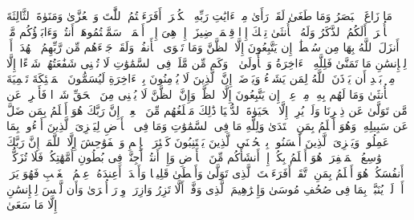 \startbuffer[\q:53:17]
مَا زَاغَ ٱلۡبَصَرُ وَمَا طَغَىٰ%
\stopbuffer
\startbuffer[\q:53:18]
لَقَدۡ رَأَىٰ مِنۡ ءَایَٰتِ رَبِّهِ ٱلۡكُبۡرَىٰۤ%
\stopbuffer
\startbuffer[\q:53:19]
أَفَرَءَیۡتُمُ ٱللَّٰتَ وَٱلۡعُزَّىٰ%
\stopbuffer
\startbuffer[\q:53:20]
وَمَنَوٰةَ ٱلثَّالِثَةَ ٱلۡأُخۡرَىٰۤ%
\stopbuffer
\startbuffer[\q:53:21]
أَلَكُمُ ٱلذَّكَرُ وَلَهُ ٱلۡأُنثَىٰ%
\stopbuffer
\startbuffer[\q:53:22]
تِلۡكَ إِذࣰا قِسۡمَةࣱ ضِیزَىٰۤ%
\stopbuffer
\startbuffer[\q:53:23]
إِنۡ هِیَ إِلَّاۤ أَسۡمَاۤءࣱ سَمَّیۡتُمُوهَاۤ أَنتُمۡ وَءَابَاۤؤُكُم مَّاۤ أَنزَلَ ٱللَّهُ بِهَا مِن سُلۡطَٰنٍۚ إِن یَتَّبِعُونَ إِلَّا ٱلظَّنَّ وَمَا تَهۡوَى ٱلۡأَنفُسُۖ وَلَقَدۡ جَاۤءَهُم مِّن رَّبِّهِمُ ٱلۡهُدَىٰۤ%
\stopbuffer
\startbuffer[\q:53:24]
أَمۡ لِلۡإِنسَٰنِ مَا تَمَنَّىٰ%
\stopbuffer
\startbuffer[\q:53:25]
فَلِلَّهِ ٱلۡءَاخِرَةُ وَٱلۡأُولَىٰ%
\stopbuffer
\startbuffer[\q:53:26]
۞ وَكَم مِّن مَّلَكࣲ فِی ٱلسَّمَٰوَٰتِ لَا تُغۡنِی شَفَٰعَتُهُمۡ شَیۡءًا إِلَّا مِنۢ بَعۡدِ أَن یَأۡذَنَ ٱللَّهُ لِمَن یَشَاۤءُ وَیَرۡضَىٰۤ%
\stopbuffer
\startbuffer[\q:53:27]
إِنَّ ٱلَّذِینَ لَا یُؤۡمِنُونَ بِٱلۡءَاخِرَةِ لَیُسَمُّونَ ٱلۡمَلَٰۤئِكَةَ تَسۡمِیَةَ ٱلۡأُنثَىٰ%
\stopbuffer
\startbuffer[\q:53:28]
وَمَا لَهُم بِهِۦ مِنۡ عِلۡمٍۖ إِن یَتَّبِعُونَ إِلَّا ٱلظَّنَّۖ وَإِنَّ ٱلظَّنَّ لَا یُغۡنِی مِنَ ٱلۡحَقِّ شَیۡءࣰا%
\stopbuffer
\startbuffer[\q:53:29]
فَأَعۡرِضۡ عَن مَّن تَوَلَّىٰ عَن ذِكۡرِنَا وَلَمۡ یُرِدۡ إِلَّا ٱلۡحَیَوٰةَ ٱلدُّنۡیَا%
\stopbuffer
\startbuffer[\q:53:30]
ذَٰلِكَ مَبۡلَغُهُم مِّنَ ٱلۡعِلۡمِۚ إِنَّ رَبَّكَ هُوَ أَعۡلَمُ بِمَن ضَلَّ عَن سَبِیلِهِۦ وَهُوَ أَعۡلَمُ بِمَنِ ٱهۡتَدَىٰ%
\stopbuffer
\startbuffer[\q:53:31]
وَلِلَّهِ مَا فِی ٱلسَّمَٰوَٰتِ وَمَا فِی ٱلۡأَرۡضِ لِیَجۡزِیَ ٱلَّذِینَ أَسَٰۤءُوا۟ بِمَا عَمِلُوا۟ وَیَجۡزِیَ ٱلَّذِینَ أَحۡسَنُوا۟ بِٱلۡحُسۡنَى%
\stopbuffer
\startbuffer[\q:53:32]
ٱلَّذِینَ یَجۡتَنِبُونَ كَبَٰۤئِرَ ٱلۡإِثۡمِ وَٱلۡفَوَٰحِشَ إِلَّا ٱللَّمَمَۚ إِنَّ رَبَّكَ وَٰسِعُ ٱلۡمَغۡفِرَةِۚ هُوَ أَعۡلَمُ بِكُمۡ إِذۡ أَنشَأَكُم مِّنَ ٱلۡأَرۡضِ وَإِذۡ أَنتُمۡ أَجِنَّةࣱ فِی بُطُونِ أُمَّهَٰتِكُمۡۖ فَلَا تُزَكُّوۤا۟ أَنفُسَكُمۡۖ هُوَ أَعۡلَمُ بِمَنِ ٱتَّقَىٰۤ%
\stopbuffer
\startbuffer[\q:53:33]
أَفَرَءَیۡتَ ٱلَّذِی تَوَلَّىٰ%
\stopbuffer
\startbuffer[\q:53:34]
وَأَعۡطَىٰ قَلِیلࣰا وَأَكۡدَىٰۤ%
\stopbuffer
\startbuffer[\q:53:35]
أَعِندَهُۥ عِلۡمُ ٱلۡغَیۡبِ فَهُوَ یَرَىٰۤ%
\stopbuffer
\startbuffer[\q:53:36]
أَمۡ لَمۡ یُنَبَّأۡ بِمَا فِی صُحُفِ مُوسَىٰ%
\stopbuffer
\startbuffer[\q:53:37]
وَإِبۡرَٰهِیمَ ٱلَّذِی وَفَّىٰۤ%
\stopbuffer
\startbuffer[\q:53:38]
أَلَّا تَزِرُ وَازِرَةࣱ وِزۡرَ أُخۡرَىٰ%
\stopbuffer
\startbuffer[\q:53:39]
وَأَن لَّیۡسَ لِلۡإِنسَٰنِ إِلَّا مَا سَعَىٰ%
\stopbuffer
